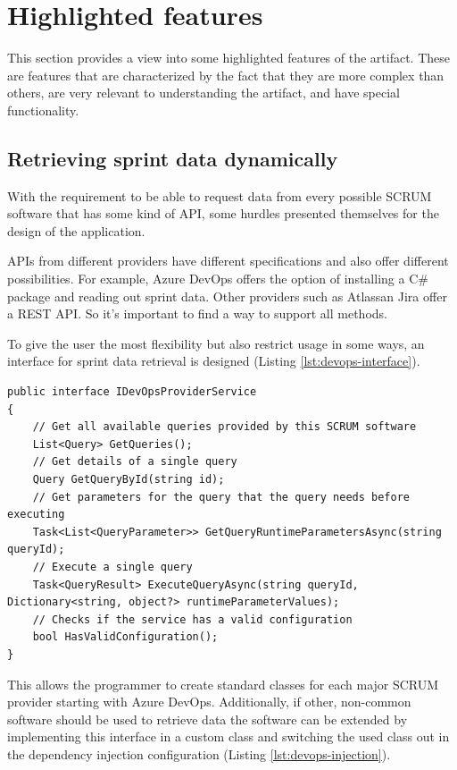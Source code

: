 \section{Highlighted features}

This section provides a view into some highlighted features of the artifact. 
These are features that are characterized by the fact that they are more complex than others, 
are very relevant to understanding the artifact, 
and have special functionality. 

\subsection{Retrieving sprint data dynamically}

With the requirement to be able to request data from every possible SCRUM software that has some kind of API, 
some hurdles presented themselves for the design of the application. 

APIs from different providers have different specifications and also offer different possibilities. 
For example, Azure DevOps offers the option of installing a C\# package and reading out sprint data. 
Other providers such as Atlassan Jira offer a REST API. 
So it's important to find a way to support all methods.

To give the user the most flexibility but also restrict usage in some ways, 
an interface for sprint data retrieval is designed (Listing \ref{lst:devops-interface}).

\begin{lstlisting}[style=csharp, caption=Expression base class, label=lst:devops-interface]
public interface IDevOpsProviderService
{
    // Get all available queries provided by this SCRUM software 
    List<Query> GetQueries();
    // Get details of a single query  
    Query GetQueryById(string id);
    // Get parameters for the query that the query needs before executing  
    Task<List<QueryParameter>> GetQueryRuntimeParametersAsync(string queryId);
    // Execute a single query  
    Task<QueryResult> ExecuteQueryAsync(string queryId, Dictionary<string, object?> runtimeParameterValues);
    // Checks if the service has a valid configuration  
    bool HasValidConfiguration();
}
\end{lstlisting}

This allows the programmer to create standard classes for each major SCRUM provider starting with Azure DevOps. 
Additionally, if other, non-common software should be used to retrieve data the software can be extended by implementing this interface in a custom class and switching the used class out in the dependency injection configuration (Listing \ref{lst:devops-injection}). 

